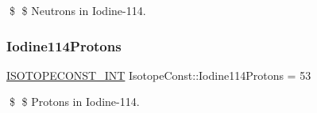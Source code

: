\$ \$ Neutrons in Iodine-\/114. \mbox{\label{group___isotope_const-_iodine-_i114_ga39133441e5de1c39f2e098c9a0133cc4}} 
\subsubsection{\texorpdfstring{Iodine114\+Protons}{Iodine114Protons}}
{\footnotesize\ttfamily \mbox{\hyperlink{group___isotope_const-_macros_ga5f18360b3e99483a35c32d789e62621c}{I\+S\+O\+T\+O\+P\+E\+C\+O\+N\+S\+T\+\_\+\+I\+NT}} Isotope\+Const\+::\+Iodine114\+Protons = 53}

\$ \$ Protons in Iodine-\/114. 